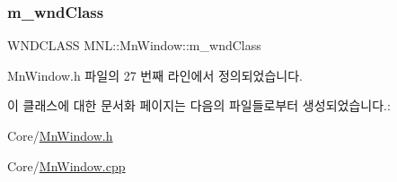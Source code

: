 \subsubsection{\texorpdfstring{m\+\_\+wnd\+Class}{m\_wndClass}}
{\footnotesize\ttfamily W\+N\+D\+C\+L\+A\+SS M\+N\+L\+::\+Mn\+Window\+::m\+\_\+wnd\+Class\hspace{0.3cm}{\ttfamily [private]}}



Mn\+Window.\+h 파일의 27 번째 라인에서 정의되었습니다.



이 클래스에 대한 문서화 페이지는 다음의 파일들로부터 생성되었습니다.\+:\begin{DoxyCompactItemize}
\item 
Core/\hyperlink{_mn_window_8h}{Mn\+Window.\+h}\item 
Core/\hyperlink{_mn_window_8cpp}{Mn\+Window.\+cpp}\end{DoxyCompactItemize}
